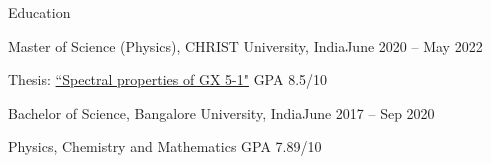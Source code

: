 \begin{rSection}{Education}
\hspace{-1.2em}\begin{rSubsection}{Master of Science (Physics), CHRIST University, India}{\hfill June 2020 – May 2022}{}{}
\item []\hspace{-0.7em}Thesis: \href{https://drive.google.com/file/d/1FP9Bz25hufUrWuRfMA0RLzUTm0Spqp-I/view?usp=sharing}{``Spectral properties of GX 5-1"} \hspace{24.4em} GPA 8.5/10
\end{rSubsection}
\vspace{-0.5em}
\hspace{-1.2em}\begin{rSubsection}{Bachelor of Science, Bangalore University, India}{June 2017 – Sep 2020}{}{}
\item []\hspace{-0.7em}Physics, Chemistry and Mathematics \hspace{25em} GPA 7.89/10
\end{rSubsection}
\end{rSection}